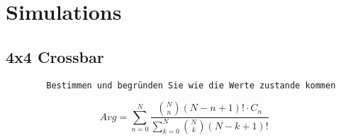 \documentclass[]{scrartcl}
\begin{document}
    \section{Simulations}
    \subsection{4x4 Crossbar}
    \begin{verbatim}
        Bestimmen und begründen Sie wie die Werte zustande kommen
    \end{verbatim}

    \begin{equation}
        Avg = \sum_{n=0}^N \frac{\binom{N}{n}\left( N-n+1 \right)! \cdot C_n }{\sum_{k=0}^N \binom{N}{k}\left( N-k+1 \right)!}
    \end{equation}
\end{document}
